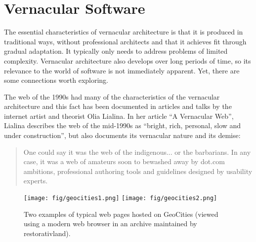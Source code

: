 \section{Vernacular Software}


The essential characteristics of vernacular architecture is that it is produced in traditional
ways, without professional architects and that it achieves fit through gradual adaptation.
It typically only needs to address problems of limited complexity. Vernacular architecture
also develops over long periods of time, so its relevance to the world of software is not
immediately apparent. Yet, there are some connections worth exploring.

The web of the 1990s had many of the characteristics of the vernacular architecture and this
fact has been documented in articles and talks by the internet artist and theorist
Olia Lialina.
In her article ``A Vernacular Web'', Lialina describes the web of the mid-1990s as ``bright, rich, personal,
slow and under construction'', but also documents its vernacular nature and its demise:

\begin{quote}
One could say it was the web of the indigenous... or the barbarians. In any case, it was a web
of amateurs soon to bewashed away by dot.com ambitions, professional authoring tools and
guidelines designed by usability experts.
\end{quote}

\begin{figure}
\centering
\texttt{[image: fig/geocities1.png]}
\texttt{[image: fig/geocities2.png]}
\caption{Two examples of typical web pages hosted on GeoCities (viewed using a modern
web browser in an archive maintained by restorativland).}
\label{fig:geocities}
\end{figure}



